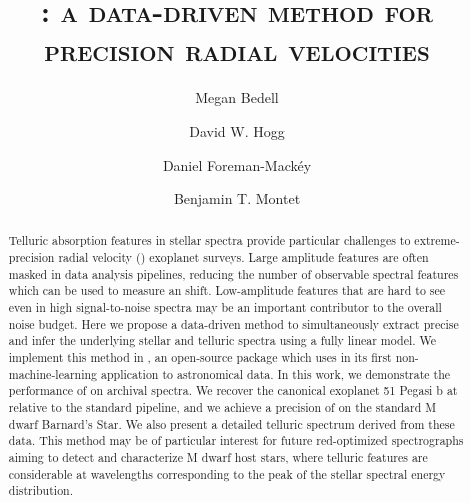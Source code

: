 \documentclass[modern]{aastex62}
\newcommand{\Mdwarf}{Barnard's Star}
\begin{document}
\sloppy\sloppypar\raggedbottom\frenchspacing %

\shorttitle{\wobble}

\graphicspath{ {figures/} }

\title{\textsc{\wobble: a data-driven method for precision radial velocities}}

\author[0000-0001-9907-7742]{Megan Bedell}
\affiliation{\flatiron}

\author[0000-0003-2866-9403]{David W. Hogg}
\affiliation{\flatiron}

\author{Daniel Foreman-Mack\'{e}y}
\affiliation{\flatiron}

\author{Benjamin T. Montet}
\affiliation{\chicago}


\begin{abstract}
Telluric absorption features in stellar spectra provide particular challenges to extreme-precision radial velocity (\EPRV) exoplanet surveys. 
Large amplitude features are often masked in data analysis pipelines, reducing the number of observable spectral features which can be used to measure an \RV shift.
Low-amplitude features that are hard to see even in high signal-to-noise spectra may be an important contributor to the overall \RV noise budget.
Here we propose a data-driven method to simultaneously extract precise \RVs and infer the underlying stellar and telluric spectra using a fully linear model. 
We implement this method in \wobble, an open-source \python package which uses \TF in its first non-machine-learning application to astronomical data. 
In this work, we demonstrate the performance of \wobble on archival \HARPS spectra.
We recover the canonical exoplanet 51 Pegasi b at  relative to the standard \HARPS pipeline, and we achieve a precision of  \cms on the \RV standard M dwarf \Mdwarf. 
We also present a detailed telluric spectrum derived from these data. 
This method may be of particular interest for future red-optimized spectrographs aiming to detect and characterize M dwarf host stars, where telluric features are considerable at wavelengths corresponding to the peak of the stellar spectral energy distribution.  \end{abstract}
\end{document}
